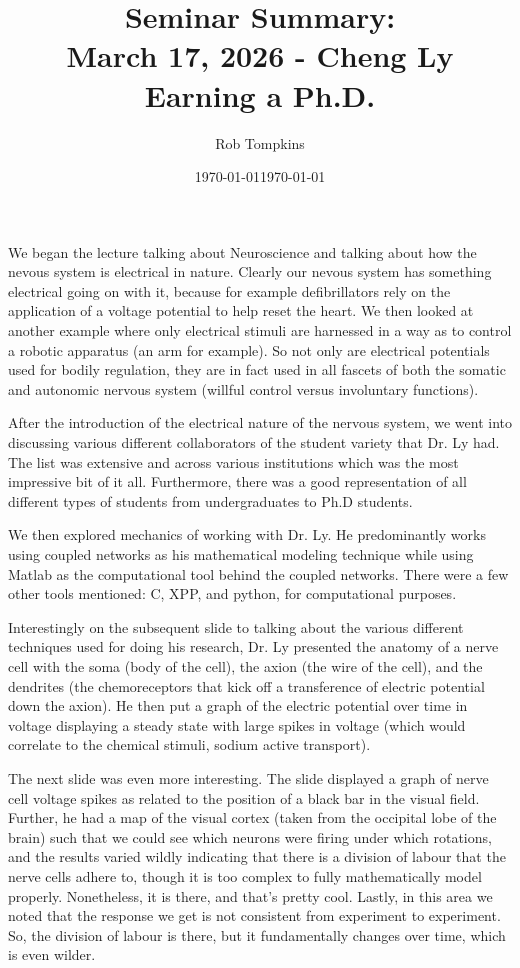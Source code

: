 \documentclass[12pt]{amsart}
\title{Seminar Summary:\\March 17, 2026 - Cheng Ly\\Earning a Ph.D.}
\author{Rob Tompkins}
\date{\today}
\theoremstyle{definition}
\theoremstyle{question}
\begin{document}
    \maketitle
    \date{\today}
    \begin{onehalfspace}
        We began the lecture talking about Neuroscience and talking about how the nevous system is electrical
        in nature.
        Clearly our nevous system has something electrical going on with it, because for example defibrillators
        rely on the application of a voltage potential to help reset the heart.
        We then looked at another example where only electrical stimuli are harnessed in a way as to control a robotic
        apparatus (an arm for example).
        So not only are electrical potentials used for bodily regulation, they are in fact used in all fascets of
        both the somatic and autonomic nervous system (willful control versus involuntary functions).

        After the introduction of the electrical nature of the nervous system, we went into discussing various different
        collaborators of the student variety that Dr. Ly had.
        The list was extensive and across various institutions which was the most impressive bit of it all.
        Furthermore, there was a good representation of all different types of students from undergraduates to Ph.D
        students.

        We then explored mechanics of working with Dr. Ly.
        He predominantly works using coupled networks as his mathematical modeling technique while using Matlab as
        the computational tool behind the coupled networks.
        There were a few other tools mentioned: C, XPP, and python, for computational purposes.

        Interestingly on the subsequent slide to talking about the various different techniques used for doing his research,
        Dr. Ly presented the anatomy of a nerve cell with the soma (body of the cell), the axion (the wire of the cell),
        and the dendrites (the chemoreceptors that kick off a transference of electric potential down the axion).
        He then put a graph of the electric potential over time in voltage displaying a steady state with large spikes
        in voltage (which would correlate to the chemical stimuli, sodium active transport).

        The next slide was even more interesting.
        The slide displayed a graph of nerve cell voltage spikes as related to the position of a black bar in the visual
        field.
        Further, he had a map of the visual cortex (taken from the occipital lobe of the brain) such that we could see
        which neurons were firing under which rotations, and the results varied wildly indicating that there is a
        division of labour that the nerve cells adhere to, though it is too complex to fully mathematically model
        properly.
        Nonetheless, it is there, and that's pretty cool.
        Lastly, in this area we noted that the response we get is not consistent from experiment to experiment.
        So, the division of labour is there, but it fundamentally changes over time, which is even wilder.


\end{onehalfspace}
\end{document}
